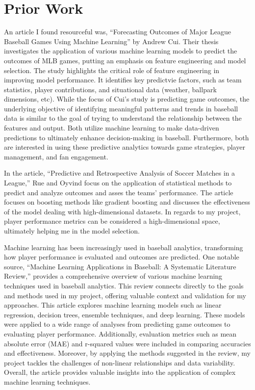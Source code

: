 \documentclass[10pt,twocolumn]{article}
\begin{document}
\section{Prior Work}

An article I found resourceful was, “Forecasting Outcomes of Major League Baseball Games Using Machine Learning” \cite{9} by Andrew Cui. Their thesis investigates the application of various machine learning models to predict the outcomes of MLB games, putting an emphasis on feature engineering and model selection. The study highlights the critical role of feature engineering in improving model performance. It identifies key predictvie factors, such as team statistics, player contributions, and situational data (weather, ballpark dimensions, etc). While the focus of Cui’s study is predicting game outcomes, the underlying objective of identifying meaningful patterns and trends in baseball data is similar to the goal of trying to understand the relationship between the features and output. Both utilize machine learning to make data-driven predictions to ultimately enhance decision-making in baseball. Furthermore, both are interested in using these predictive analytics towards game strategies, player management, and fan engagement. 

In the article, “Predictive and Retrospective Analysis of Soccer Matches in a League,” \cite{10} Rue and Oyvind focus on the application of statistical methods to predict and analyze outcomes and asses the teams’ performance. The article focuses on boosting methods like gradient boosting and discusses the effectiveness of the model dealing with high-dimensional datasets. In regards to my project, player performance metrics can be considered a high-dimensional space, ultimately helping me in the model selection. 

Machine learning has been increasingly used in baseball analytics, transforming how player performance is evaluated and outcomes are predicted. One notable source, “Machine Learning Applications in Baseball: A Systematic Literature Review,” \cite{11}provides a comprehensive overview of various machine learning techniques used in baseball analytics. This review connects directly to the goals and methods used in my project, offering valuable context and validation for my approaches. This article explores machine learning models such as linear regression, decision trees, ensemble techniques, and deep learning. These models were applied to a wide range of analyses from predicting game outcomes to evaluating player performance. Additionally, evaluation metrics such as mean absolute error (MAE) and r-squared values were included in comparing accuracies and effectiveness. Moreover, by applying the methods suggested in the review, my project tackles the challenges of non-linear relationships and data variability. Overall, the article provides valuable insights into the application of complex machine learning techniques.
\end{document}
